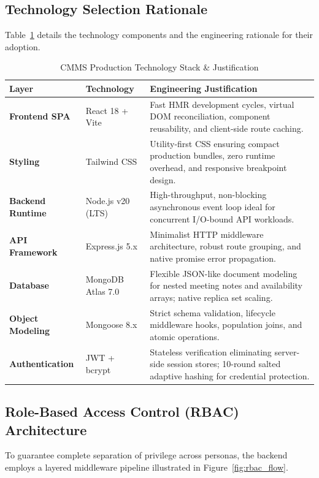 \documentclass[11pt,a4paper]{article}
\begin{document}
\subsection{Technology Selection Rationale}
Table~\ref{tab:tech_stack} details the technology components and the engineering rationale for their adoption.

\begin{table}[H]
\centering
\small
\begin{tabularx}{\textwidth}{p{2.6cm}p{3.2cm}X}
\toprule
\rowcolor{lightgray} \textbf{Layer} & \textbf{Technology} & \textbf{Engineering Justification} \\
\midrule
\textbf{Frontend SPA} & React 18 + Vite & Fast HMR development cycles, virtual DOM reconciliation, component reusability, and client-side route caching. \\
\midrule
\textbf{Styling} & Tailwind CSS & Utility-first CSS ensuring compact production bundles, zero runtime overhead, and responsive breakpoint design. \\
\midrule
\textbf{Backend Runtime} & Node.js v20 (LTS) & High-throughput, non-blocking asynchronous event loop ideal for concurrent I/O-bound API workloads. \\
\midrule
\textbf{API Framework} & Express.js 5.x & Minimalist HTTP middleware architecture, robust route grouping, and native promise error propagation. \\
\midrule
\textbf{Database} & MongoDB Atlas 7.0 & Flexible JSON-like document modeling for nested meeting notes and availability arrays; native replica set scaling. \\
\midrule
\textbf{Object Modeling} & Mongoose 8.x & Strict schema validation, lifecycle middleware hooks, population joins, and atomic operations. \\
\midrule
\textbf{Authentication} & JWT + bcrypt & Stateless verification eliminating server-side session stores; 10-round salted adaptive hashing for credential protection. \\
\bottomrule
\end{tabularx}
\caption{CMMS Production Technology Stack \& Justification}
\label{tab:tech_stack}
\end{table}

\subsection{Role-Based Access Control (RBAC) Architecture}
To guarantee complete separation of privilege across personas, the backend employs a layered middleware pipeline illustrated in Figure~\ref{fig:rbac_flow}.
\end{document}
